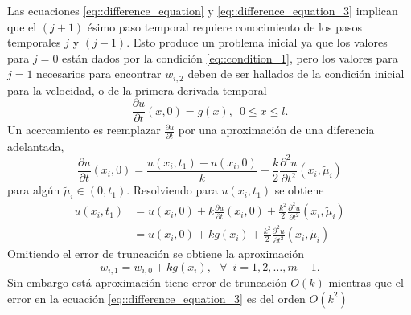 \documentclass[a4paper]{article}
\begin{document}
Las ecuaciones \ref{eq::difference_equation} y \ref{eq::difference_equation_3} implican que el $(j+1)$ ésimo paso temporal requiere conocimiento de los pasos temporales $j$ y $(j-1)$. Esto produce un problema inicial ya que los valores para $j=0$ están dados por la condición \ref{eq::condition_1}, pero los valores para $j=1$ necesarios para encontrar $w_{i,2}$ deben de ser hallados de la condición inicial para la velocidad, o de la primera derivada temporal
\begin{equation}
\frac{\partial u}{\partial t}(x,0)=g(x),\,\,\,0\leq x \leq l.
\end{equation}
Un acercamiento es reemplazar $\frac{\partial u}{\partial t}$ por una aproximación de una diferencia adelantada,
\begin{equation}
\frac{\partial u}{\partial t}(x_i,0)=\frac{u(x_i,t_1)-u(x_i,0)}{k}-\frac{k}{2}\frac{\partial^2 u}{\partial t^2}(x_i,\tilde{\mu}_i)
\end{equation}
para algún $\tilde{\mu}_i \in (0,t_1)$. Resolviendo para $u(x_i,t_1)$ se obtiene
\begin{equation}
\begin{aligned}
u(x_i,t_1)&=u(x_i,0)+k\frac{\partial u}{\partial t}(x_i,0)+\frac{k^2}{2}\frac{\partial^2 u}{\partial t^2}(x_i,\tilde{\mu}_i)\\
&=u(x_i,0)+kg(x_i)+\frac{k^2}{2}\frac{\partial^2 u}{\partial t^2}(x_i,\tilde{\mu}_i)
\end{aligned}
\end{equation} 
Omitiendo el error de truncación se obtiene la aproximación
\begin{equation}
w_{i,1}=w_{i,0}+kg(x_i),\,\,\,\,\forall\,\,\, i=1,2,\hdots,m-1.
\end{equation}
Sin embargo está aproximación tiene error de truncación $O(k)$ mientras que el error en la ecuación \ref{eq::difference_equation_3} es del orden $O(k^2)$
\end{document}
